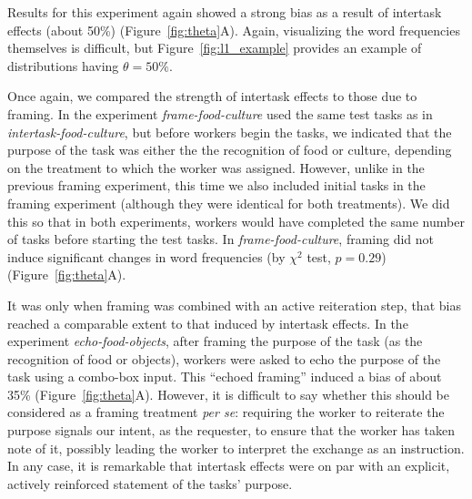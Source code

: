 \documentclass{sigchi}
\begin{document}
Results for this experiment again showed a 
strong bias as a result of intertask effects (about 50\%) 
(Figure~\ref{fig:theta}A).  Again, visualizing the word frequencies 
themselves is difficult, but Figure~\ref{fig:l1_example} provides an 
example of distributions having $\theta = 50\%$.

Once again, we compared the strength of intertask effects to those due to 
framing. In the experiment \textit{frame-food-culture} used
the same test tasks as in \textit{intertask-food-culture}, but before
workers begin the tasks, we indicated
that the purpose of the task was either the the recognition of food or 
culture, depending on the treatment to which the worker was assigned.  
However, unlike in the previous framing experiment, this time we also 
included initial tasks in the framing experiment (although they were 
identical for both treatments).  We did this so that in both experiments,
workers would have completed the same number of tasks before starting the
test tasks.  In \textit{frame-food-culture}, framing did not induce 
significant changes in word frequencies 
(by $\chi^2$ test, $p=0.29$) (Figure~\ref{fig:theta}A).

It was only when framing was combined with an active reiteration step, 
that bias reached a comparable extent to that induced by intertask 
effects.  In the experiment \textit{echo-food-objects},
after framing the purpose of the task (as the recognition of food
or objects), workers were asked to echo the purpose of the task
using a combo-box input.  This  ``echoed framing'' induced a bias of about 
35\% (Figure~\ref{fig:theta}A). However, it is difficult to say whether this 
should be considered as a framing treatment \textit{per se}:
requiring the worker to reiterate the purpose signals our intent, as the 
requester, to ensure that the worker has taken note of it, possibly leading 
the worker to interpret the exchange as an instruction.  
In any case, it is remarkable that intertask effects
were on par with an explicit, actively reinforced statement of the tasks' 
purpose.
\end{document}
